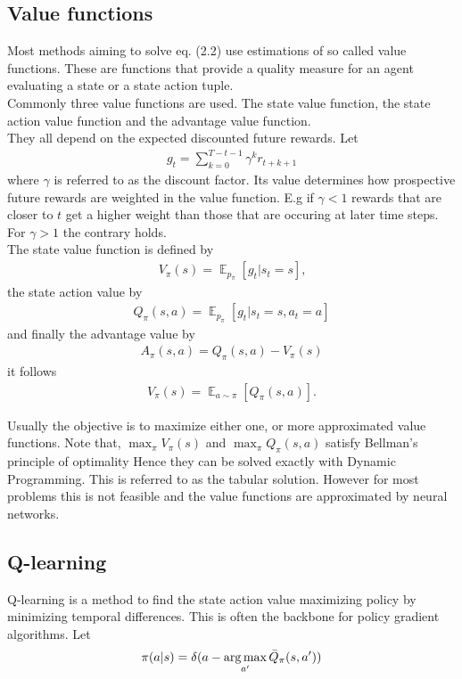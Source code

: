 \subsection{Value functions}
Most methods aiming to solve eq. (2.2) use estimations of so called value functions. These are functions that provide a quality measure for an agent evaluating a state or a state action tuple. \\
Commonly three value functions are used. The state value function, the state action value function and the advantage value function.\\
They all depend on the expected discounted future rewards. Let
\begin{align}
	g_t = \sum^{T-t-1}_{k=0} \gamma^k r_{t+k+1}
\end{align}
where $\gamma$ is referred to as the discount factor. Its value determines how prospective future rewards are weighted in the value function. E.g if $\gamma<1$ rewards that are closer to $t$ get a higher weight than those that are occuring at later time steps. For $\gamma>1$ the contrary holds.\\
The state value function is defined by
\begin{align}
	V_{\pi}(s) = \mathop{\mathbb{E}}_{p_{\pi}}\left[g_t|s_t=s \right]\text{,}
\end{align}
the state action value by
\begin{align}
	Q_{\pi}(s, a) = \mathop{\mathbb{E}}_{p_{\pi}}\left[g_t|s_t=s, a_t=a \right]
\end{align}
and finally the advantage value by
\begin{align}
	A_{\pi}(s, a) = Q_{\pi}(s, a) - V_{\pi}(s)
\end{align}
it follows
\begin{align}
	V_{\pi}(s) = \mathop{\mathbb{E}}_{a\sim\pi}\left[ Q_{\pi}(s, a)\right] .
\end{align}

\noindent Usually the objective is to maximize either one, or more approximated value functions.
Note that, $\max_{\pi}V_{\pi}(s)$ and $\max_{\pi}Q_{\pi}(s, a)$ satisfy Bellman's principle of optimality \cite{wikibell} Hence they can be solved exactly with Dynamic Programming. This is referred to as the tabular solution. However for most problems this is not feasible and the value functions are approximated by neural networks. \\

\subsection{Q-learning}
Q-learning is a method to find the state action value maximizing policy by minimizing temporal differences. This is often the backbone for policy gradient algorithms. Let
\begin{align}
\pi(a|s) = \delta(a - \operatorname*{arg\,max}_{a'}\bar{Q}_{\pi}(s, a'))
\end{align}

